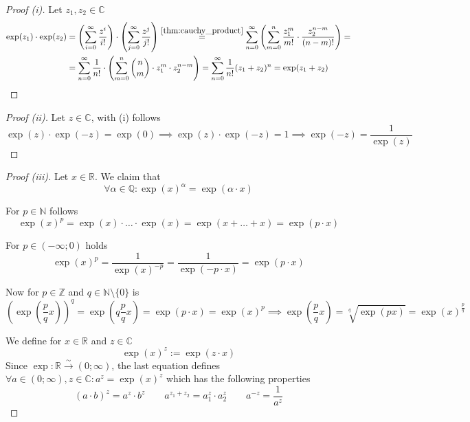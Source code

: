\documentclass[english,titlepage]{uzhpub}
\theoremstyle{definition}
\theoremstyle{plain}
\theoremstyle{remark}
\theoremstyle{example}
\begin{document}
   \begin{proof}[Proof (i)]
      Let \(z_1, z_2 \in \mathbb{C}\)
      \begin{equation*}
         \begin{split}
         \exp(z_1) \cdot \exp(z_2) & = \left(\sum_{i=0}^\infty \frac{z^i}{i!}\right) \cdot \left(\sum_{j=0}^\infty \frac{z^j}{j!}\right) \overset{\ref{thm:cauchy_product}}{=} \sum_{n=0}^\infty \left(\sum_{m=0}^n \frac{z_1^m}{m!} \cdot \frac{z_2^{n-m}}{(n-m)!}\right) = \\
                                   & = \sum_{n=0}^\infty \frac{1}{n!} \cdot \left(\sum_{m=0}^n \binom{n}{m} \cdot z_1^m \cdot z_2^{n-m}\right) = \sum_{n=0}^\infty \frac{1}{n!} (z_1 + z_2)^n = \exp(z_1 + z_2)
         \end{split}
      \end{equation*}
   \end{proof}

   \begin{proof}[Proof (ii)]
      Let \(z \in \mathbb{C}\), with (i) follows
      \[\exp(z) \cdot \exp(-z) = \exp(0) \implies \exp(z) \cdot \exp(-z) = 1 \implies \exp(-z) = \frac{1}{\exp(z)}\]
   \end{proof}

   \begin{proof}[Proof (iii)]
      Let \(x \in \mathbb{R}\).
      We claim that
      \[\forall \alpha \in \mathbb{Q}: \exp(x)^\alpha = \exp(\alpha \cdot x)\]

      For \(p \in \mathbb{N}\) follows
      \[\exp(x)^p = \exp(x) \cdot \ldots \cdot \exp(x) = \exp(x + \ldots + x) = \exp(p \cdot x)\]

      For \(p \in (-\infty;0)\) holds
      \[\exp(x)^p = \frac{1}{\exp(x)^{-p}} = \frac{1}{\exp(-p \cdot x)} = \exp(p \cdot x)\]

      Now for \(p \in \mathbb{Z}\) and \(q \in \mathbb{N} \setminus \{0\}\) is
      \[\left(\exp\left(\frac{p}{q} x\right)\right)^q = \exp\left(q \frac{p}{q} x\right) = \exp(p \cdot x) = \exp(x)^p \implies \exp\left(\frac{p}{q} x\right) = \sqrt[q]{\exp(px)} = \exp(x)^{\frac{p}{q}}\]

      We define for \(x \in \mathbb{R}\) and \(z \in \mathbb{C}\)
      \[\exp(x)^z := \exp(z \cdot x)\]
      Since \(\exp: \mathbb{R} \xrightarrow{\sim} (0;\infty)\), the last equation defines \(\forall a \in (0;\infty), z \in \mathbb{C}: a^z = \exp(x)^z\) which has the following properties
      \[(a \cdot b)^z = a^z \cdot b^z \qquad a^{z_1 + z_2} = a^z_1 \cdot a^z_2 \qquad a^{-z} = \frac{1}{a^z}\]
   \end{proof}
\end{document}
